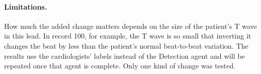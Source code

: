 \paragraph{Limitations.} How much the added change matters depends on the size of the patient's T wave in this lead. In record 100, for example, the T wave is so small that inverting it changes the beat by less than the patient's normal beat-to-beat variation. The results use the cardiologists' labels instead of the Detection agent and will be repeated once that agent is complete. Only one kind of change was tested.
